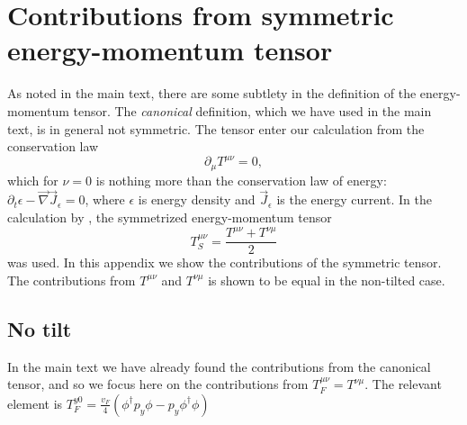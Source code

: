 \chapter{Contributions from symmetric energy-momentum tensor}
As noted in the main text, there are some subtlety in the definition of the energy-momentum tensor.
The \emph{canonical} definition, which we have used in the main text, is in general not symmetric.
The tensor enter our calculation from the conservation law
\[
\partial_\mu T^{\mu \nu} = 0,
\]
which for \( \nu = 0 \) is nothing more than the conservation law of energy: \( \partial_t \epsilon - \vec{\nabla} \vec{J}_\epsilon = 0 \), where \( \epsilon \) is energy density and \( \vec{J}_\epsilon \) is the energy current.
In the calculation by \citeauthor{arjonaFingerprintsConformalAnomaly2019}\cite{arjonaFingerprintsConformalAnomaly2019}, the symmetrized energy-momentum tensor
\[
T_S^{\mu \nu} = \frac{T^{\mu \nu} + T^{\nu \mu}}{2}
\]
was used.
In this appendix we show the contributions of the symmetric tensor.
The contributions from \( T^{\mu \nu} \) and \( T^{\nu \mu} \) is shown to be equal in the non-tilted case.

\section{No tilt}
In the main text we have already found the contributions from the canonical tensor, and so we focus here on the contributions from \( T_F^{\mu \nu } = T^{\nu \mu} \).
The relevant element is \( T_F^{y 0} = \frac{v_F}{4}\left( \phi^{\dagger} p_y \phi - p_y\phi^{\dagger} \phi \right) \)

